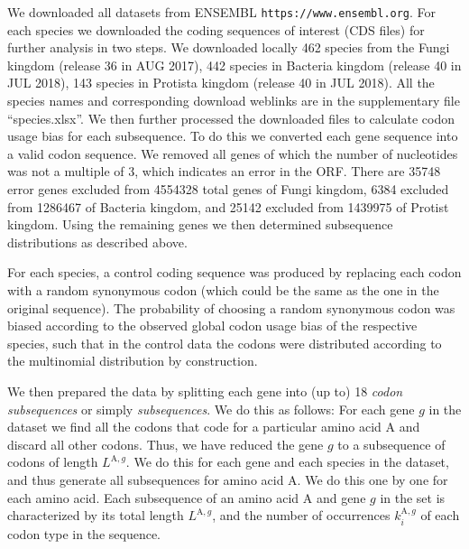 \documentclass[a4paper,10pt]{paper}%
\begin{document}
We downloaded all datasets from  ENSEMBL {\tt https://www.ensembl.org}.  For each species we  downloaded the  coding sequences of interest (CDS files) for further analysis in  two steps. We downloaded locally 462 species from the  Fungi kingdom (release 36 in AUG 2017), 442 species in Bacteria kingdom (release 40 in JUL 2018), 143 species in Protista kingdom (release 40 in JUL 2018). All the species names and corresponding download weblinks are in the supplementary file ``species.xlsx''. We then further processed  the downloaded files  to calculate  codon usage bias  for each subsequence.  To do this  we converted  each gene sequence into a valid codon sequence.  We removed all genes of which the number of nucleotides was not a multiple of 3, which indicates an error in the ORF. There are 35748 error genes excluded from 4554328 total genes of Fungi kingdom, 6384 excluded from 1286467 of Bacteria kingdom, and 25142 excluded from 1439975 of Protist kingdom. Using the remaining genes we then determined subsequence distributions as described above. 
\par
For each species, a control  coding sequence was produced by replacing each codon with a random synonymous codon (which could be the same as the one in the original sequence). The probability of choosing a random synonymous codon was biased according to the observed global codon usage bias of the respective species, such that in the control data the codons were distributed according to the multinomial distribution by construction. 
\par
We then  prepared the data by splitting each gene into (up to) 18 {\em codon subsequences} or simply {\em subsequences}. We do this as follows: For each gene $g$ in the dataset we find all the codons that code for a particular amino acid A and discard all other codons. Thus, we have reduced the gene $g$ to a subsequence of codons of length $L^{\textrm{A},g}$. We do this for each gene and each species in the dataset, and thus generate all subsequences for amino acid A. We do this one by one for each amino acid. Each  subsequence  of an amino acid A and gene $g$  in the set is characterized by  its total length $L^{\textrm{A},g}$, and the number of occurrences $k_i^{\textrm{A},g}$ of each codon type in the sequence. 
\end{document}
